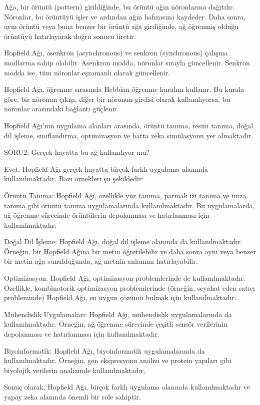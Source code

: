 \documentclass[11pt]{article}
\begin{document}
Ağa, bir örüntü (pattern) girildiğinde, bu örüntü ağın nöronlarına dağıtılır. Nöronlar, bu örüntüyü işler ve ardından ağın hafızasına kaydeder. Daha sonra, aynı örüntü veya buna benzer bir örüntü ağa girdiğinde, ağ öğrenmiş olduğu örüntüyü hatırlayarak doğru sonucu üretir.

Hopfield Ağı, asenkron (asynchronous) ve senkron (synchronous) çalışma modlarına sahip olabilir. Asenkron modda, nöronlar sırayla güncellenir. Senkron modda ise, tüm nöronlar eşzamanlı olarak güncellenir.

Hopfield Ağı, öğrenme sırasında Hebbian öğrenme kuralını kullanır. Bu kurala göre, bir nöronun çıkışı, diğer bir nöronun girdisi olarak kullanılıyorsa, bu nöronlar arasındaki bağlantı güçlenir.

Hopfield Ağı'nın uygulama alanları arasında, örüntü tanıma, resim tanıma, doğal dil işleme, sınıflandırma, optimizasyon ve hatta zeka simülasyonu yer almaktadır.




SORU2: Gerçek hayatta bu ağ kullanılıyor mu?

Evet, Hopfield Ağı gerçek hayatta birçok farklı uygulama alanında kullanılmaktadır. Bazı örnekleri şu şekildedir:

Örüntü Tanıma: Hopfield Ağı, özellikle yüz tanıma, parmak izi tanıma ve imza tanıma gibi örüntü tanıma uygulamalarında kullanılmaktadır. Bu uygulamalarda, ağ öğrenme sürecinde örüntülerin depolanması ve hatırlanması için kullanılmaktadır.

Doğal Dil İşleme: Hopfield Ağı, doğal dil işleme alanında da kullanılmaktadır. Örneğin, bir Hopfield Ağına bir metin öğretilebilir ve daha sonra aynı veya benzer bir metin ağa sunulduğunda, ağ metnin anlamını hatırlayabilir.

Optimizasyon: Hopfield Ağı, optimizasyon problemlerinde de kullanılmaktadır. Özellikle, kombinatorik optimizasyon problemlerinde (örneğin, seyahat eden satıcı probleminde) Hopfield Ağı, en uygun çözümü bulmak için kullanılmaktadır.

Mühendislik Uygulamaları: Hopfield Ağı, mühendislik uygulamalarında da kullanılmaktadır. Örneğin, ağ öğrenme sürecinde çeşitli sensör verilerinin depolanması ve hatırlanması için kullanılmaktadır.

Biyoinformatik: Hopfield Ağı, biyoinformatik uygulamalarında da kullanılmaktadır. Örneğin, gen ekspresyonu analizi ve protein yapıları gibi biyolojik verilerin analizinde kullanılmaktadır.

Sonuç olarak, Hopfield Ağı, birçok farklı uygulama alanında kullanılmaktadır ve yapay zeka alanında önemli bir role sahiptir.
\end{document}
